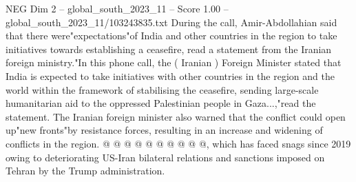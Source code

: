 \begin{textsample}{NEG Dim 2 – global\_south\_2023\_11 – Score 1.00 – global\_south\_2023\_11/103243835.txt}
During the call, Amir-Abdollahian said that there were"expectations"of India and other countries in the region to take initiatives towards establishing a ceasefire, read a statement from the Iranian foreign ministry."In this phone call, the ( Iranian ) Foreign Minister stated that India is expected to take initiatives with other countries in the region and the world within the framework of stabilising the ceasefire, sending large-scale humanitarian aid to the oppressed Palestinian people in Gaza...,"read the statement.
The Iranian foreign minister also warned that the conflict could open up"new fronts"by resistance forces, resulting in an increase and widening of conflicts in the region. @ @ @ @ @ @ @ @ @ @, which has faced snags since 2019 owing to deteriorating US-Iran bilateral relations and sanctions imposed on Tehran by the Trump administration.

\end{textsample}
